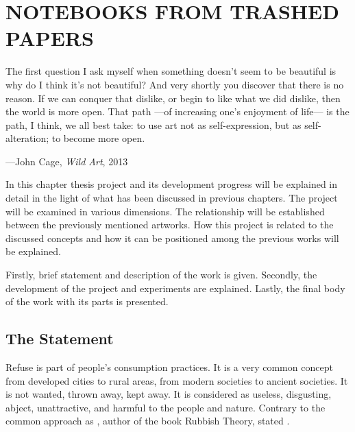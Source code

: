 \chapter{NOTEBOOKS FROM TRASHED PAPERS}



\begin{singlespace}
\epigraph{The first question I ask myself when something doesn't seem to be beautiful is why do I think it's not beautiful? And very shortly you discover that there is no reason. If we can conquer that dislike, or begin to like what we did dislike, then the world is more open. That path ---of increasing one's enjoyment of life--- is the path, I think, we all best take: to use art not as self-expression, but as self-alteration; to become more open.}{\hfill---John Cage, \textit{Wild Art}, 2013}
\end{singlespace}





In this chapter thesis project and its development progress will be explained in detail in the light of what has been discussed in previous chapters. The project will be examined in various dimensions. The relationship will be established between the previously mentioned artworks. How this project is related to the discussed concepts and how it can be positioned among the previous works will be explained.

Firstly, brief statement and description of the work is given. Secondly, the development of the project and experiments are explained. Lastly, the final body of the work with its parts is presented.





%
%
\section{The Statement}
Refuse is part of people’s consumption practices. It is a very common concept from developed cities to rural areas, from modern societies to ancient societies. It is not wanted, thrown away, kept away. It is considered as useless, disgusting, abject, unattractive, and harmful to the people and nature. Contrary to the common approach as \cite{thompson1979rubbish}, author of the book Rubbish Theory, stated .

